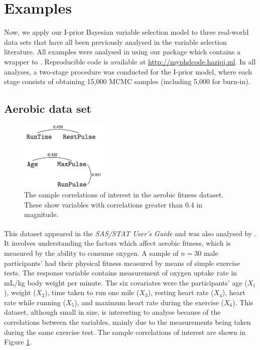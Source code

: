 \documentclass[showframe,11pt,twoside,openright]{report}
\begin{document}
\section{Examples}

Now, we apply our I-prior Bayesian variable selection model to three real-world data sets that have all been previously analysed in the variable selection literature.
All examples were analysed in  using our  package \citep{jamil2018ripriorBVS} which contains a wrapper to  \citep{plummer2003jags}.
Reproducible code is available at \url{http://myphdcode.haziqj.ml}.
In all analyses, a two-stage procedure was conducted for the I-prior model, where each stage consists of obtaining 15,000 MCMC samples (including 5,000 for burn-in).

\subsection{Aerobic data set}

\begin{figure}[htb]
	\centering
	\includegraphics[height=1.3in]{figure/aerobic-cor}
	\caption[The sample correlations of interest in the aerobic fitness dataset]{The sample correlations of interest in the aerobic fitness dataset. These show variables with correlations greater than 0.4 in magnitude. \label{fig:aerobic-cor}}
\end{figure}

This dataset appeared in the \textit{SAS/STAT\textsuperscript{\textregistered} User's Guide} \citep{SAS2008} and was also analysed by \citet{Kuo1998}. 
It involves understanding the factors which affect aerobic fitness, which is measured by the ability to consume oxygen. 
A sample of $n=30$ male participants' had their physical fitness measured by means of simple exercise tests. 
The response variable contains measurement of oxygen uptake rate in mL/kg body weight per minute. 
The six covariates were the participants' age ($X_1$), weight ($X_2$), time taken to run one mile ($X_3$), resting heart rate ($X_4$), heart rate while running ($X_5$), and maximum heart rate during the exercise ($X_6$). 
This dataset, although small in size, is interesting to analyse because of the correlations between the variables, mainly due to the measurements being taken during the same exercise test. 
The sample correlations of interest are shown in Figure \cref{fig:aerobic-cor}.
\end{document}
